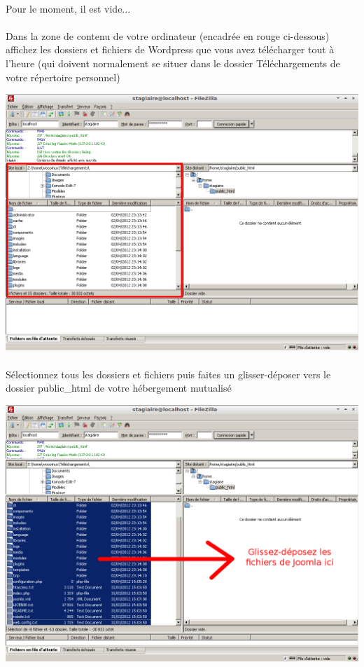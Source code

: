 \documentclass[10pt,a4paper]{article}
\begin{document}
\paragraph{}Pour le moment, il est vide...
\paragraph{}Dans la zone de contenu de votre ordinateur (encadrée en rouge ci-dessous) affichez les dossiers et fichiers de Wordpress que vous avez télécharger tout à l'heure (qui doivent normalement se situer dans le dossier Téléchargements de votre répertoire personnel)
\begin{center}
\includegraphics[scale=0.35]{img/0035.png}
\end{center}
\paragraph{}Sélectionnez tous les dossiers et fichiers puis faites un glisser-déposer vers le dossier public\_html de votre hébergement mutualisé
\begin{center}
\includegraphics[scale=0.35]{img/0036.png}
\end{center}
\end{document}
